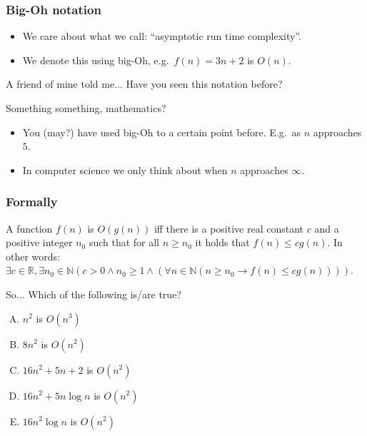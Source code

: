 \begin{frame}
	\frametitle{Big-Oh notation}

	\begin{itemize}
		\item We care about what we call: ``asymptotic run time complexity''.
		\item We denote this using big-Oh, e.g.\ $f(n) = 3n + 2$ is $O(n)$.
	\end{itemize}
	\pause
	\begin{block}{A friend of mine told me...}
		Have you seen this notation before?
	\end{block}
	\pause
	\begin{block}{Something something, mathematics?}
	\begin{itemize}
		\item You (may?) have used big-Oh to a certain point before. E.g.\ as $n$ approaches $5$.
			\pause
		\item In computer science we only think about when $n$ approaches $\infty$.
	\end{itemize}
	\end{block}
\end{frame}

\begin{frame}
	\frametitle{Formally}
	\begin{definition}[Big-Oh]
		A function $f(n)$ is $O(g(n))$ iff there is a positive real constant $c$ and a positive integer $n_0$ such that for
		all $n \geq n_0$ it holds that $f(n) \leq c g(n)$. In other words:\\
		$\exists c \in \mathbb{R}, \exists n_0 \in \mathbb{N} (c > 0 \wedge n_0 \geq 1 \wedge (\forall n \in \mathbb{N} (n
		\geq n_0 \to f(n) \leq cg(n))))$.
	\end{definition}
	\pause
	\begin{block}{So...}
		Which of the following is/are true?
		\begin{enumerate}[A.]
			\item $n^2$ is $O(n^3)$
			\item $8n^2$ is $O(n^2)$
			\item $16n^2 + 5n + 2$ is $O(n^2)$
			\item $16n^2 + 5n \log n$ is $O(n^2)$
			\item $16n^2\log n$ is $O(n^2)$
		\end{enumerate}
	\end{block}
\end{frame}

